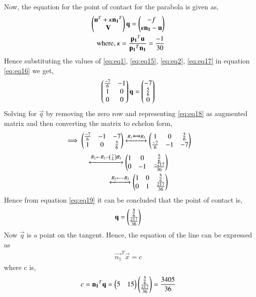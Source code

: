 \documentclass[journal,12pt,twocolumn]{IEEEtran}
\begin{document}
\begin{enumerate}
	Now, the equation for the point of contact for the parabola is given as,
	\begin{align}
		\begin{pmatrix}\mathbf{u}^T+\kappa\mathbf{n_1}^T\\\mathbf{V}\end{pmatrix}\mathbf{q} = \begin{pmatrix}-f\\\kappa\mathbf{n_1}-\mathbf{u}\end{pmatrix}\label{eq:eq16}\\
		\mbox{where, } \kappa = \frac{\mathbf{p_1}^T\mathbf{u}}{\mathbf{p_1}^T\mathbf{n_1}} = \frac{-1}{30} \label{eq:eq17}
	\end{align}
	Hence substituting the values of \eqref{eq:eq1}, \eqref{eq:eq15}, \eqref{eq:eq2}, \eqref{eq:eq17} in equation \eqref{eq:eq16} we get,
	\begin{align}
		\begin{pmatrix}\frac{-7}{6}&-1\\1&0\\0&0\end{pmatrix}\mathbf{q} = \begin{pmatrix}-7\\\frac{5}{6}\\0\end{pmatrix}
		\label{eq:eq18}
	\end{align}
	Solving for $\vec{q}$ by removing the zero row and representing \eqref{eq:eq18} as augmented matrix and then converting the matrix to echelon form,
	\begin{align}
		\implies \begin{pmatrix}\frac{-7}{6}&-1&-7\\1&0&\frac{5}{6}\end{pmatrix} \xleftrightarrow[]{R_1\xleftrightarrow[]{}R_2} \begin{pmatrix}1&0&\frac{5}{6}\\\frac{-7}{6}&-1&-7\end{pmatrix}
	\end{align}
	\begin{align}
		\xleftrightarrow[]{R_2\leftarrow R_2-\ensuremath{\left(\frac{7}{6}\right)}R_1} \begin{pmatrix}1&0&\frac{5}{6}\\0&-1&\frac{-217}{36}\end{pmatrix} \\
		\xleftrightarrow[]{R_2\leftarrow  -R_2} \begin{pmatrix}1&0&\frac{5}{6}\\0&1&\frac{217}{36}\end{pmatrix}
		\label{eq:eq19}
	\end{align}
	Hence from equation \eqref{eq:eq19} it can be concluded that the point of contact is,
	\begin{align}
		\mathbf{q} = \begin{pmatrix}\frac{5}{6}\\\frac{217}{36}\end{pmatrix}
	\end{align}
	Now $\vec{q}$ is a point on the tangent. Hence, the equation of the
	line can be expressed as
	\begin{align}
		\vec{n_1}^T\vec{x} = c
		\label{eq:eq20}
	\end{align}
	where c is,
	\begin{align}
		c = \vec{n_1}^T\vec{q} = \myvec{5&15}\myvec{\frac{5}{6}\\\frac{217}{36}} = \frac{3405}{36} 

\end{align}
\end{enumerate}
\end{document}
